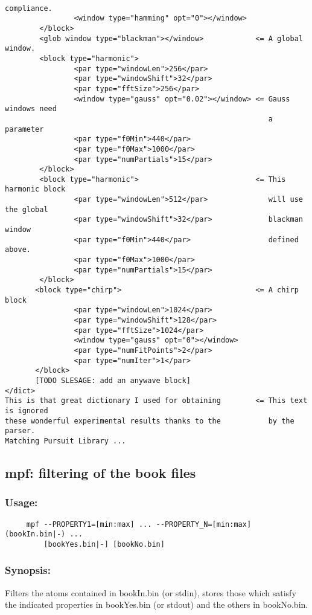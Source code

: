 \documentclass[11pt,a4paper]{article}
\begin{document}
\begin{verbatim}
                                                            compliance.
                <window type="hamming" opt="0"></window>
        </block>
        <glob window type="blackman"></window>            <= A global window.
        <block type="harmonic">
                <par type="windowLen">256</par>
                <par type="windowShift">32</par>
                <par type="fftSize">256</par>
                <window type="gauss" opt="0.02"></window> <= Gauss windows need
                                                             a parameter
                <par type="f0Min">440</par>
                <par type="f0Max">1000</par>
                <par type="numPartials">15</par>
        </block>
        <block type="harmonic">                           <= This harmonic block
                <par type="windowLen">512</par>              will use the global
                <par type="windowShift">32</par>             blackman window
                <par type="f0Min">440</par>                  defined above.
                <par type="f0Max">1000</par>
                <par type="numPartials">15</par>
        </block>
       <block type="chirp">                               <= A chirp block
                <par type="windowLen">1024</par>
                <par type="windowShift">128</par>
                <par type="fftSize">1024</par>
                <window type="gauss" opt="0"></window>
                <par type="numFitPoints">2</par>
                <par type="numIter">1</par>
       </block>
       [TODO SLESAGE: add an anywave block]
</dict>
This is that great dictionary I used for obtaining        <= This text is ignored
these wonderful experimental results thanks to the           by the parser.
Matching Pursuit Library ...
\end{verbatim}


\clearpage
\subsection{mpf: filtering of the book files}

\subsubsection*{Usage:}
\begin{verbatim}
     mpf --PROPERTY1=[min:max] ... --PROPERTY_N=[min:max] (bookIn.bin|-) ...
         [bookYes.bin|-] [bookNo.bin]
\end{verbatim}

\subsubsection*{Synopsis:}
Filters the atoms contained in bookIn.bin (or stdin), stores those which
satisfy the indicated properties in bookYes.bin (or stdout) and the others in
bookNo.bin.
\end{document}
